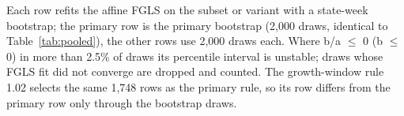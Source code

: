 \begin{table}[htbp]
\begin{tabularx}{\linewidth}
\bottomrule
\end{tabularx}
\par\smallskip
\begin{minipage}{\linewidth}\footnotesize\raggedright
Each row refits the affine FGLS on the subset or variant with a state-week bootstrap; the primary row is the primary bootstrap (2,000 draws, identical to Table~\ref{tab:pooled}), the other rows use 2,000 draws each. Where b/a $\le$ 0 (b $\le$ 0) in more than 2.5\% of draws its percentile interval is unstable; draws whose FGLS fit did not converge are dropped and counted. The growth-window rule 1.02 selects the same 1,748 rows as the primary rule, so its row differs from the primary row only through the bootstrap draws.
\end{minipage}
\end{table}
